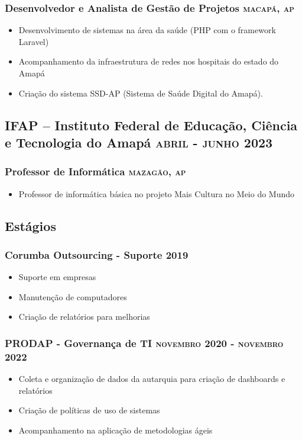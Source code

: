 \documentclass{article}
\newcommand{\rside}[1]{\hfill \normalfont\scshape\MakeLowercase{#1}}
\begin{document}
\subsubsection{ Desenvolvedor e Analista de Gestão de Projetos  \rside{Macapá, AP}}
\begin{itemize}
  \item Desenvolvimento de sistemas na área da saúde (PHP com o framework Laravel)
  \item Acompanhamento da infraestrutura de redes nos hospitais do estado do Amapá
  \item Criação do sistema SSD-AP (Sistema de Saúde Digital do Amapá).
\end{itemize}

\subsection{IFAP – Instituto Federal de Educação, Ciência e Tecnologia do Amapá \rside{Abril - Junho 2023}}
\subsubsection{ Professor de Informática  \rside{Mazagão, AP}}
\begin{itemize}
  \item Professor de informática básica no projeto Mais Cultura no Meio do Mundo
\end{itemize}

\subsection{Estágios}
\subsubsection{Corumba Outsourcing - Suporte \rside{2019}}
\begin{itemize}
  \item Suporte em empresas
  \item Manutenção de computadores
  \item Criação de relatórios para melhorias
\end{itemize}
\subsubsection{PRODAP - Governança de TI \rside{Novembro 2020 - Novembro 2022}}
\begin{itemize}
  \item Coleta e organização de dados da autarquia para criação de dashboards e relatórios
  \item Criação de políticas de uso de sistemas
  \item Acompanhamento na aplicação de metodologias ágeis
\end{itemize}
\end{document}
